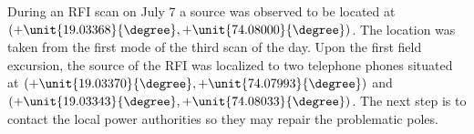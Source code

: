 \documentclass[a4paper,12pt]{article}
\begin{document}
                                                                                                                                                                                                                                                                                                                                                                                                                                                                                                                                                                                                                                                                                                                                                                                                                                                                                                                                                                                                                                                                                                                                                                                                                                                                                                                                                                                                                                                                                                                                                                                                                                                                                                                                                                                                                                                                                                                                                                                                                                   During an RFI scan on July 7 a source was observed to be located at $(+\unit{19.03368}{\degree},+\unit{74.08000}{\degree})$. The location was taken from the first mode of the third scan of the day. Upon the first field excursion, the source of the RFI was localized to two telephone phones situated at $(+\unit{19.03370}{\degree},+\unit{74.07993}{\degree})$ and $(+\unit{19.03343}{\degree},+\unit{74.08033}{\degree})$. The next step is to contact the local power authorities so they may repair the problematic poles.
\end{document}
